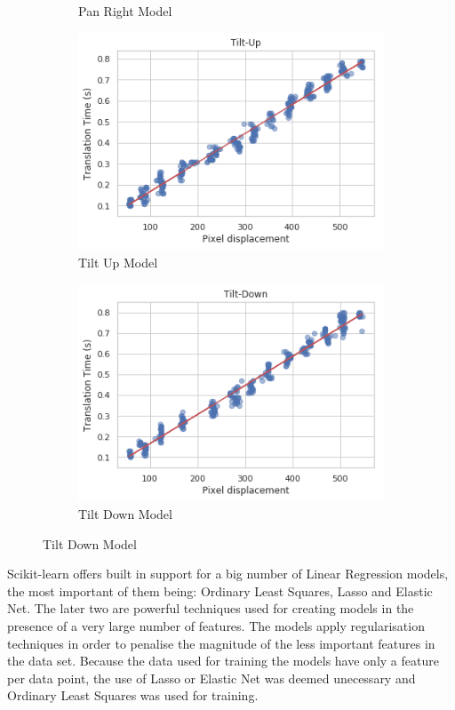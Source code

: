 \documentclass{l4proj}
\begin{document}
\begin{figure}[H]
\begin{subfigure}[b]{0.5\textwidth}
    \caption{Pan Right Model}
    \label{panrightmodel}
  \end{subfigure}
  \begin{subfigure}[b]{0.5\textwidth}
    \includegraphics[width=\textwidth]{l4template-master/images/tilt_up.png}
    \caption{Tilt Up Model}
    \label{tiltup}
  \end{subfigure}
  \begin{subfigure}[b]{0.5\textwidth}
    \includegraphics[width=\textwidth]{l4template-master/images/tilt_down.png}
    \caption{Tilt Down Model}
    \label{tiltdown}
  \end{subfigure}  
    
\end{figure}



Scikit-learn offers built in support for a big number of Linear Regression models, the most important of them being: Ordinary Least Squares, Lasso and Elastic Net. The later two are powerful techniques used for creating models in the presence of a very large number of features. The models apply regularisation techniques in order to penalise the magnitude of the less important features in the data set. Because the data used for training the models have only a feature per data point, the use of Lasso or Elastic Net was deemed unecessary and Ordinary Least Squares was used for training. 
\end{document}
